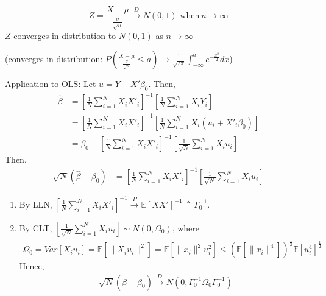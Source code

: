 \documentclass[11pt]{elegantbook}
\begin{document}
\begin{theorem}\label{CLT}
    $$Z=\frac{\overline{X}-\mu}{\frac{\sigma}{\sqrt{n}}} \xrightarrow {D} N(0,1) \text{ when}\ n\to \infty$$
    $Z$ \underline{converges in distribution} to $N(0,1)$ as $n\to \infty$

    (converges in distribution: $P(\frac{\overline{X}-\mu}{\frac{\sigma}{\sqrt{n}}}\leq a)\rightarrow \frac{1}{\sqrt{2\pi}}\int_{-\infty}^ae^{-\frac{x^2}{2}}dx$)
\end{theorem}
Application to OLS: Let $u=Y-X'\beta_0$. Then,
\begin{equation}
    \begin{aligned}
        \hat{\beta}&=\left[\frac{1}{N}\sum_{i=1}^N X_i X'_i\right]^{-1}\left[\frac{1}{N}\sum_{i=1}^N X_iY_i\right]\\
        &=\left[\frac{1}{N}\sum_{i=1}^N X_i X'_i\right]^{-1}\left[\frac{1}{N}\sum_{i=1}^N X_i(u_i+X'_i\beta_0)\right]\\
        &=\beta_0+\left[\frac{1}{N}\sum_{i=1}^N X_i X'_i\right]^{-1}\left[\frac{1}{\sqrt{N}}\sum_{i=1}^N X_i u_i\right]
    \end{aligned}
    \nonumber
\end{equation}
Then,
\begin{equation}
    \begin{aligned}
        \sqrt{N}(\hat{\beta}-\beta_0)&=\left[\frac{1}{N}\sum_{i=1}^N X_iX
        '_i\right]^{-1}\left[\frac{1}{\sqrt{N}}\sum_{i=1}^N X_i u_i\right]
    \end{aligned}
    \nonumber
\end{equation}
\begin{enumerate}
    \item By LLN, $\left[\frac{1}{N}\sum_{i=1}^N X_iX
    '_i\right]^{-1} \xrightarrow{P} \mathbb{E}[XX']^{-1}\triangleq \Gamma_0^{-1}$.
    \item By CLT, $\left[\frac{1}{\sqrt{N}}\sum_{i=1}^N X_i u_i\right]\sim N(0,\Omega_0)$, where
    \begin{equation}
        \begin{aligned}
            \Omega_0=Var[X_iu_i]=\mathbb{E}[\|X_iu_i\|^2]=\mathbb{E}[\|x_i\|^2u_i^2]\leq \left(\mathbb{E}[\|x_i\|^4]\right)^\frac{1}{2}\mathbb{E}[u_i^4]^{\frac{1}{2}}
        \end{aligned}
        \nonumber
    \end{equation}
    Hence,
    \begin{equation}
        \begin{aligned}
            \sqrt{N}(\hat{\beta}-\beta_0) \xrightarrow{D} N\left(0,\Gamma_0^{-1}\Omega_0 \Gamma_0^{-1}\right)
        \end{aligned}
        \nonumber
    \end{equation}
\end{enumerate}
\end{document}
